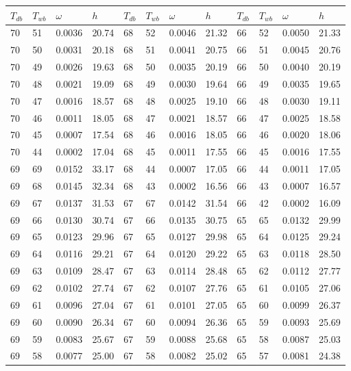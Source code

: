 \begin{tabular}{llll|llll|llll}
 \toprule 
\(T_{db}\) & \(T_{wb}\) & \(\omega\) & \(h\) & \(T_{db}\) & \(T_{wb}\) & \(\omega\) & \(h\) & \(T_{db}\) & \(T_{wb}\) & \(\omega\) & \(h\)  \\ \midrule 
70 & 51 & 0.0036 & 20.74 & 68 & 52 & 0.0046 & 21.32 & 66 & 52 & 0.0050 & 21.33\\
70 & 50 & 0.0031 & 20.18 & 68 & 51 & 0.0041 & 20.75 & 66 & 51 & 0.0045 & 20.76\\
70 & 49 & 0.0026 & 19.63 & 68 & 50 & 0.0035 & 20.19 & 66 & 50 & 0.0040 & 20.19\\
70 & 48 & 0.0021 & 19.09 & 68 & 49 & 0.0030 & 19.64 & 66 & 49 & 0.0035 & 19.65\\
70 & 47 & 0.0016 & 18.57 & 68 & 48 & 0.0025 & 19.10 & 66 & 48 & 0.0030 & 19.11\\
70 & 46 & 0.0011 & 18.05 & 68 & 47 & 0.0021 & 18.57 & 66 & 47 & 0.0025 & 18.58\\
70 & 45 & 0.0007 & 17.54 & 68 & 46 & 0.0016 & 18.05 & 66 & 46 & 0.0020 & 18.06\\
70 & 44 & 0.0002 & 17.04 & 68 & 45 & 0.0011 & 17.55 & 66 & 45 & 0.0016 & 17.55\\
69 & 69 & 0.0152 & 33.17 & 68 & 44 & 0.0007 & 17.05 & 66 & 44 & 0.0011 & 17.05\\
69 & 68 & 0.0145 & 32.34 & 68 & 43 & 0.0002 & 16.56 & 66 & 43 & 0.0007 & 16.57\\
69 & 67 & 0.0137 & 31.53 & 67 & 67 & 0.0142 & 31.54 & 66 & 42 & 0.0002 & 16.09\\
69 & 66 & 0.0130 & 30.74 & 67 & 66 & 0.0135 & 30.75 & 65 & 65 & 0.0132 & 29.99\\
69 & 65 & 0.0123 & 29.96 & 67 & 65 & 0.0127 & 29.98 & 65 & 64 & 0.0125 & 29.24\\
69 & 64 & 0.0116 & 29.21 & 67 & 64 & 0.0120 & 29.22 & 65 & 63 & 0.0118 & 28.50\\
69 & 63 & 0.0109 & 28.47 & 67 & 63 & 0.0114 & 28.48 & 65 & 62 & 0.0112 & 27.77\\
69 & 62 & 0.0102 & 27.74 & 67 & 62 & 0.0107 & 27.76 & 65 & 61 & 0.0105 & 27.06\\
69 & 61 & 0.0096 & 27.04 & 67 & 61 & 0.0101 & 27.05 & 65 & 60 & 0.0099 & 26.37\\
69 & 60 & 0.0090 & 26.34 & 67 & 60 & 0.0094 & 26.36 & 65 & 59 & 0.0093 & 25.69\\
69 & 59 & 0.0083 & 25.67 & 67 & 59 & 0.0088 & 25.68 & 65 & 58 & 0.0087 & 25.03\\
69 & 58 & 0.0077 & 25.00 & 67 & 58 & 0.0082 & 25.02 & 65 & 57 & 0.0081 & 24.38\\

\end{tabular}
